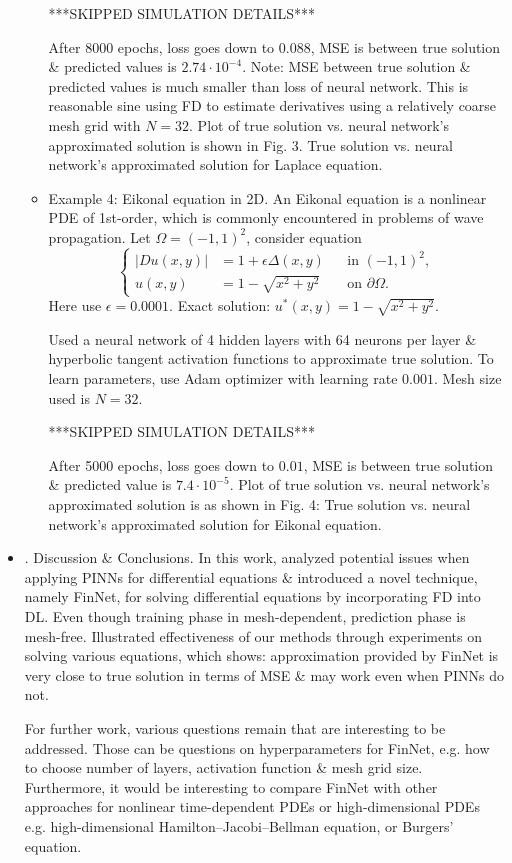 \documentclass{article}
\begin{document}
\begin{itemize}
\begin{itemize}
		***SKIPPED SIMULATION DETAILS***

		After 8000 epochs, loss goes down to $0.088$, MSE is between true solution \& predicted values is $2.74\cdot10^{-4}$. Note: MSE between true solution \& predicted values is much smaller than loss of neural network. This is reasonable sine using FD to estimate derivatives using a relatively coarse mesh grid with $N = 32$. Plot of true solution vs. neural network's approximated solution is shown in {\sf Fig. 3. True solution vs. neural network's approximated solution for Laplace equation.}
		\item {\sf Example 4: Eikonal equation in 2D.} An Eikonal equation is a nonlinear PDE of 1st-order, which is commonly encountered in problems of wave propagation. Let $\Omega = (-1,1)^2$, consider equation
		\begin{equation*}
			\left\{\begin{split}
				|Du(x,y)| &= 1 + \epsilon\Delta(x,y)&&\mbox{in }(-1,1)^2,\\
				u(x,y) &= 1 - \sqrt{x^2 + y^2}&&\mbox{on }\partial\Omega.
			\end{split}\right.
		\end{equation*}
		Here use $\epsilon = 0.0001$. Exact solution: $u^*(x,y) = 1 - \sqrt{x^2 + y^2}$.

		Used a neural network of 4 hidden layers with 64 neurons per layer \& hyperbolic tangent activation functions to approximate true solution. To learn parameters, use Adam optimizer with learning rate $0.001$. Mesh size used is $N = 32$.

		***SKIPPED SIMULATION DETAILS***

		After 5000 epochs, loss goes down to $0.01$, MSE is between true solution \& predicted value is $7.4\cdot10^{-5}$. Plot of true solution vs. neural network's approximated solution is as shown in {\sf Fig. 4: True solution vs. neural network's approximated solution for Eikonal equation.}
	\end{itemize}
	\item {. Discussion \& Conclusions.} In this work, analyzed potential issues when applying PINNs for differential equations \& introduced a novel technique, namely FinNet, for solving differential equations by incorporating FD into DL. Even though training phase in mesh-dependent, prediction phase is mesh-free. Illustrated effectiveness of our methods through experiments on solving various equations, which shows: approximation provided by FinNet is very close to true solution in terms of MSE \& may work even when PINNs do not.

	For further work, various questions remain that are interesting to be addressed. Those can be questions on hyperparameters for FinNet, e.g. how to choose number of layers, activation function \& mesh grid size. Furthermore, it would be interesting to compare FinNet with other approaches for nonlinear time-dependent PDEs or high-dimensional PDEs e.g. high-dimensional Hamilton--Jacobi--Bellman equation, or Burgers' equation.
\end{itemize}
\end{document}
